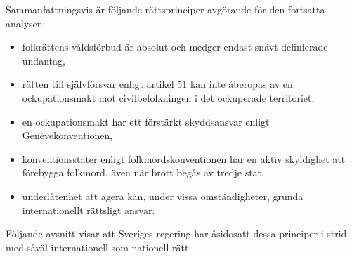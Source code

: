 Sammanfattningsvis är följande rättsprinciper avgörande för den fortsatta analysen:

\begin{itemize}
  \item folkrättens våldsförbud är absolut och medger endast snävt definierade undantag,
  \item rätten till självförsvar enligt artikel 51 kan inte åberopas av en ockupationsmakt 
  mot civilbefolkningen i det ockuperade territoriet,
  \item en ockupationsmakt har ett förstärkt skyddsansvar enligt Genèvekonventionen,
  \item konventionsstater enligt folkmordskonventionen har en aktiv skyldighet att förebygga 
  folkmord, även när brott begås av tredje stat,
  \item underlåtenhet att agera kan, under vissa omständigheter, grunda internationellt rättsligt ansvar.
\end{itemize}

Följande avsnitt visar att Sveriges regering har åsidosatt dessa principer i strid med 
såväl internationell som nationell rätt.
